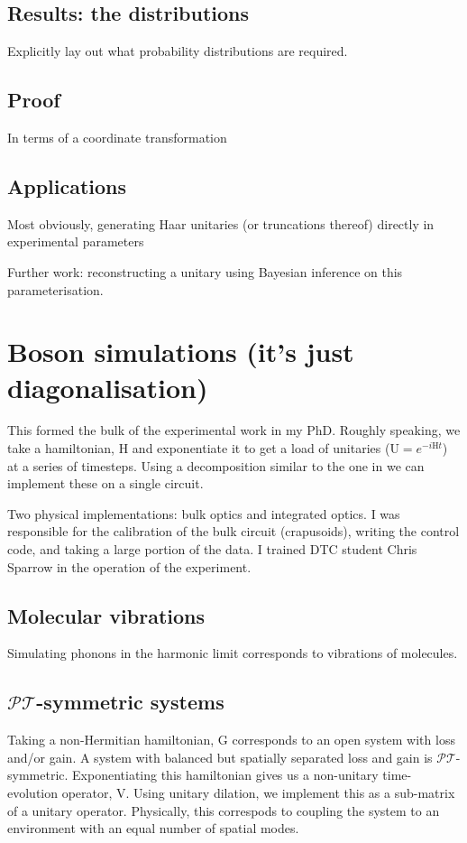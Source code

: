 \documentclass[11pt,a4paper,twoside]{report}
\newcommand{\pt}{\(\mathcal{PT}\)}
\newcommand{\mat}[1]{\mathrm{#1}}
\begin{document}
\section{Results: the distributions}
Explicitly lay out what probability distributions are required.

\section{Proof}
In terms of a coordinate transformation

\section{Applications}
Most obviously, generating Haar unitaries (or truncations thereof) directly in
experimental parameters

Further work: reconstructing a unitary using Bayesian inference on this
parameterisation.

\chapter{Boson simulations (it's just diagonalisation)}
\label{ch:Simulations}

This formed the bulk of the experimental work in my PhD. Roughly speaking, we
take a hamiltonian, \(\mat{H}\) and exponentiate it to get a load of unitaries
(\(\mat{U}=e^{-i\mat{H}t}\)) at a series of timesteps. Using a decomposition
similar to the one in \cite{reck94} we can implement these on a single
circuit.

Two physical implementations: bulk optics and integrated optics. I was
responsible for the calibration of the bulk circuit (crapusoids), writing the
control code, and taking a large portion of the data. I trained DTC student
Chris Sparrow in the operation of the experiment.

\section{Molecular vibrations}
Simulating phonons in the harmonic limit corresponds to vibrations of molecules.

\section{\pt-symmetric systems}
Taking a non-Hermitian hamiltonian, \(\mat{G}\) corresponds to an open system
with loss and/or gain. A system with balanced but spatially separated loss and
gain is \pt-symmetric. Exponentiating this hamiltonian gives us a non-unitary
time-evolution operator, \(\mat{V}\). Using unitary dilation, we implement this
as a sub-matrix of a unitary operator. Physically, this correspods to coupling
the system to an environment with an equal number of spatial modes.
\end{document}
